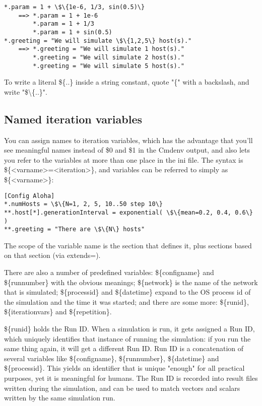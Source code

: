 \begin{Verbatim}[commandchars=\\\{\}]
*.param = 1 + \$\{1e-6, 1/3, sin(0.5)\}
    ==> *.param = 1 + 1e-6
        *.param = 1 + 1/3
        *.param = 1 + sin(0.5)
*.greeting = "We will simulate \$\{1,2,5\} host(s)."
    ==> *.greeting = "We will simulate 1 host(s)."
        *.greeting = "We will simulate 2 host(s)."
        *.greeting = "We will simulate 5 host(s)."
\end{Verbatim}


To write a literal \$\{..\} inside a string constant, quote
"\{" with a backslash, and write "\${\textbackslash}\{..\}".


\subsection{Named iteration variables}

You can assign names to iteration variables, which has the advantage
that you'll see meaningful names instead of \$0 and
\$1 in the Cmdenv output, and also lets you refer to the variables at
more than one place in the ini file. The syntax is
\$\{<varname>=<iteration>\}, and variables can be referred to simply as
\$\{<varname>\}:

\begin{Verbatim}[commandchars=\\\{\}]
[Config Aloha]
*.numHosts = \$\{N=1, 2, 5, 10..50 step 10\}
**.host[*].generationInterval = exponential( \$\{mean=0.2, 0.4, 0.6\} )
**.greeting = "There are \$\{N\} hosts"
\end{Verbatim}

The scope of the variable name is the section that defines it, plus
sections based on that section (via extends=).

There are also a number of predefined variables: \$\{configname\} and
\$\{runnumber\} with the obvious meanings; \$\{network\} is the name of
the network that is simulated; \$\{processid\} and \$\{datetime\}
expand to the OS process id of the simulation and the time it was
started; and there are some more: \$\{runid\}, \$\{iterationvars\} and
\$\{repetition\}.

\$\{runid\} holds the Run ID. When a simulation is run, it gets assigned
a Run ID, which uniquely identifies that instance of running the
simulation: if you run the same thing again, it will get a different
Run ID. Run ID is a concatenation of several variables like
\$\{configname\}, \$\{runnumber\}, \$\{datetime\} and \$\{processid\}.
This yields an identifier that is unique
"enough" for all practical purposes, yet it
is meaningful for humans. The Run ID is recorded into result files
written during the simulation, and can be used to match vectors and
scalars written by the same simulation run.

